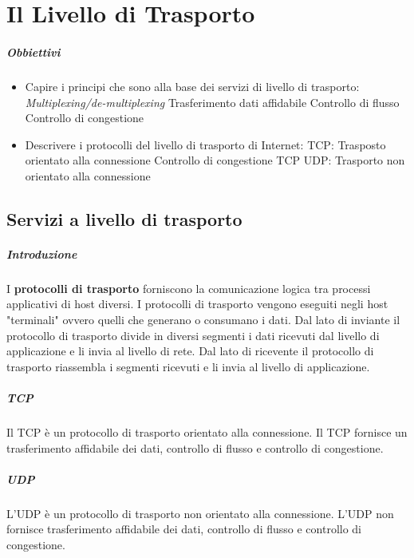 \chapter{Il Livello di Trasporto}
\thispagestyle{chapterInit}
\paragraph{Obbiettivi}
    \begin{itemize}
        \item Capire i principi che sono alla base dei servizi di livello di trasporto:
            \subitem \textit{Multiplexing/de-multiplexing}
            \subitem Trasferimento dati affidabile
            \subitem Controllo di flusso
            \subitem Controllo di congestione
        \item Descrivere i protocolli del livello di trasporto di Internet:
            \subitem \Acrshort*{TCP}: Trasposto orientato alla connessione
            \subitem Controllo di congestione TCP
            \subitem \Acrshort*{UDP}: Trasporto non orientato alla connessione
    \end{itemize}
\section{Servizi a livello di trasporto}
    \paragraph{Introduzione} I \textbf{protocolli di trasporto} forniscono la comunicazione logica tra processi applicativi di host diversi. I protocolli di trasporto vengono eseguiti negli host "terminali" ovvero quelli che generano o consumano i dati. Dal lato di inviante il protocollo di trasporto divide in diversi segmenti i dati ricevuti dal livello di applicazione e li invia al livello di rete. Dal lato di ricevente il protocollo di trasporto riassembla i segmenti ricevuti e li invia al livello di applicazione.
    \paragraph{\Acrshort*{TCP}} Il \acrfull*{TCP} è un protocollo di trasporto orientato alla connessione. Il \Acrshort*{TCP} fornisce un trasferimento affidabile dei dati, controllo di flusso e controllo di congestione.
    \paragraph{\Acrshort*{UDP}} L'\Acrfull*{UDP} è un protocollo di trasporto non orientato alla connessione. L'\Acrshort*{UDP} non fornisce trasferimento affidabile dei dati, controllo di flusso e controllo di congestione.
